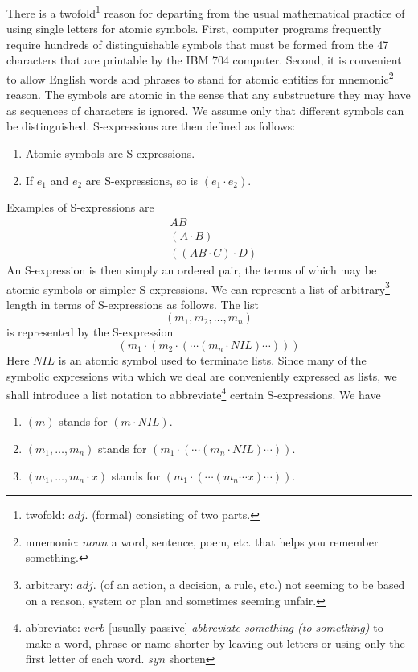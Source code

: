 \documentclass[11pt, a4paper]{article}
\begin{document}
There is a
twofold\footnote{twofold: $adj.$ (formal) consisting of two parts.}
reason for departing from the usual mathematical practice of
using single letters for atomic symbols. First, computer programs frequently
require hundreds of distinguishable symbols that must be formed from the 47
characters that are printable by the IBM 704 computer. Second, it is convenient
to allow English words and phrases to stand for atomic entities for
mnemonic\footnote{mnemonic: $noun$ a word, sentence, poem, etc. that helps you
  remember something.}
reason. The symbols are atomic in the sense that any substructure they may have
as sequences of characters is ignored. We assume only that different symbols can
be distinguished. S-expressions are then defined as follows:
\begin{enumerate}
\item Atomic symbols are S-expressions.
\item If $e_1$ and $e_2$ are S-expressions, so is $(e_1 \cdot e_2)$.
\end{enumerate}
Examples of S-expressions are
\begin{align*}
&AB          \\
&(A \cdot B) \\
&((AB \cdot C) \cdot D)
\end{align*}
An S-expression is then simply an ordered pair, the terms of which may be atomic
symbols or simpler S-expressions. We can represent a list of
arbitrary\footnote{arbitrary: $adj.$ (of an action, a decision, a rule, etc.)
  not seeming to be based on a reason, system or plan and sometimes seeming
  unfair.}
length in
terms of S-expressions as follows. The list
$$ (m_1, m_2, \ldots, m_n) $$
is represented by the S-expression
$$ (m_1 \cdot (m_2 \cdot ( \cdots (m_n \cdot NIL) \cdots ))) $$
Here $NIL$ is an atomic symbol used to terminate lists. Since many of the
symbolic expressions with which we deal are conveniently expressed as lists, we
shall introduce a list notation to
abbreviate\footnote{abbreviate: $verb$ [usually passive] \textit{abbreviate
    something (to something)} to make a word, phrase or name shorter by leaving
  out letters or using only the first letter of each word. $syn$ shorten}
certain S-expressions. We have
\begin{enumerate}
\item $(m)$ stands for $(m \cdot NIL)$.
\item $(m_1, \ldots, m_n)$ stands for
  $(m_1 \cdot ( \cdots (m_n \cdot NIL) \cdots ))$.
\item $(m_1, \ldots, m_n \cdot x)$ stands for
  $(m_1 \cdot ( \cdots (m_n \cdots x) \cdots ))$.
\end{enumerate}
\end{document}
